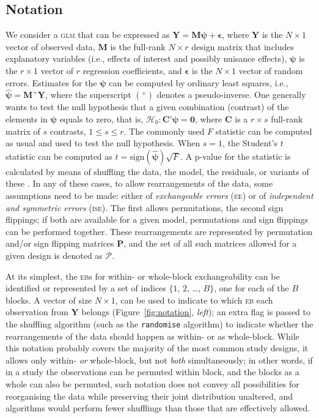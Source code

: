 \subsection{Notation}
\label{sec:ptree:notation}

We consider a \textsc{glm} that can be expressed as $\mathbf{Y} = \mathbf{M}\boldsymbol{\psi} + \boldsymbol{\epsilon}$, where $\mathbf{Y}$ is the $N \times 1$ vector of observed data, $\mathbf{M}$ is the full-rank $N \times r$ design matrix that includes explanatory variables (i.e., effects of interest and possibly nuisance effects), $\boldsymbol{\psi}$ is the $r \times 1$ vector of $r$ regression coefficients, and $\boldsymbol{\epsilon}$ is the $N \times 1$ vector of random errors. Estimates for the $\boldsymbol{\psi}$ can be computed by ordinary least squares, i.e., $\boldsymbol{\hat{\psi}} = \mathbf{M}^{+}\mathbf{Y}$, where the superscript $(^{+})$ denotes a pseudo-inverse. One generally wants to test the null hypothesis that a given combination (contrast) of the elements in $\boldsymbol{\psi}$ equals to zero, that is, $\mathcal{H}_{0} : \mathbf{C}'\boldsymbol{\psi} = \boldsymbol{0}$, where $\mathbf{C}$ is a $r \times s$ full-rank matrix of $s$ contrasts, $1 \leqslant s \leqslant r$. The commonly used $F$ statistic can be computed as usual and used to test the null hypothesis. When $s = 1$, the Student's $t$ statistic can be computed as $t=\mathrm{sign}(\boldsymbol{\hat{\psi}})\sqrt{F}$. A p-value for the statistic is calculated by means of shuffling the data, the model, the residuals, or variants of these \citep[Table~2]{Winkler2014}. In any of these cases, to allow rearrangements of the data, some assumptions need to be made: either of \emph{exchangeable errors} (\textsc{ee}) or of \emph{independent and symmetric errors} (\textsc{ise}). The first allows permutations, the second sign flippings; if both are available for a given model, permutations and sign flippings can be performed together. These rearrangements are represented by permutation and/or sign flipping matrices $\mathbf{P}$, and the set of all such matrices allowed for a given design is denoted as $\mathcal{P}$.

At its simplest, the \textsc{eb}s for within- or whole-block exchangeability can be identified or represented by a set of indices $\{1$, $2$, \ldots, $B\}$, one for each of the $B$ blocks. A vector of size $N \times 1$, can be used to indicate to which \textsc{eb} each observation from $\mathbf{Y}$ belongs (Figure~\ref{fig:notation}, \emph{left}); an extra flag is passed to the shuffling algorithm (such as the \texttt{randomise} algorithm) to indicate whether the rearrangements of the data should happen as within- or as whole-block. While this notation probably covers the majority of the most common study designs, it allows only within- \emph{or} whole-block, but not \emph{both} simultaneously; in other words, if in a study the observations can be permuted within block, and the blocks as a whole can also be permuted, such notation does not convey all possibilities for reorganising the data while preserving their joint distribution unaltered, and algorithms would perform fewer shufflings than those that are effectively allowed.

